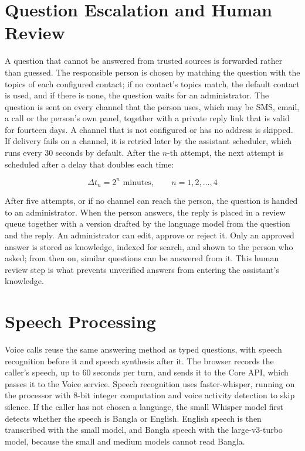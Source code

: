 \section{Question Escalation and Human Review}
A question that cannot be answered from trusted sources is forwarded rather than guessed. The responsible person is chosen by matching the question with the topics of each configured contact; if no contact's topics match, the default contact is used, and if there is none, the question waits for an administrator. The question is sent on every channel that the person uses, which may be SMS, email, a call or the person's own panel, together with a private reply link that is valid for fourteen days. A channel that is not configured or has no address is skipped. If delivery fails on a channel, it is retried later by the assistant scheduler, which runs every 30 seconds by default. After the $n$-th attempt, the next attempt is scheduled after a delay that doubles each time:

\begin{equation} \label{eq:retry}
    \Delta t_n = 2^{n} \text{ minutes}, \qquad n = 1, 2, \ldots, 4
\end{equation}

After five attempts, or if no channel can reach the person, the question is handed to an administrator. When the person answers, the reply is placed in a review queue together with a version drafted by the language model from the question and the reply. An administrator can edit, approve or reject it. Only an approved answer is stored as knowledge, indexed for search, and shown to the person who asked; from then on, similar questions can be answered from it. This human review step is what prevents unverified answers from entering the assistant's knowledge.

\section{Speech Processing}
Voice calls reuse the same answering method as typed questions, with speech recognition before it and speech synthesis after it. The browser records the caller's speech, up to 60 seconds per turn, and sends it to the Core API, which passes it to the Voice service. Speech recognition uses faster-whisper, running on the processor with 8-bit integer computation and voice activity detection to skip silence. If the caller has not chosen a language, the small Whisper model first detects whether the speech is Bangla or English. English speech is then transcribed with the small model, and Bangla speech with the large-v3-turbo model, because the small and medium models cannot read Bangla.

